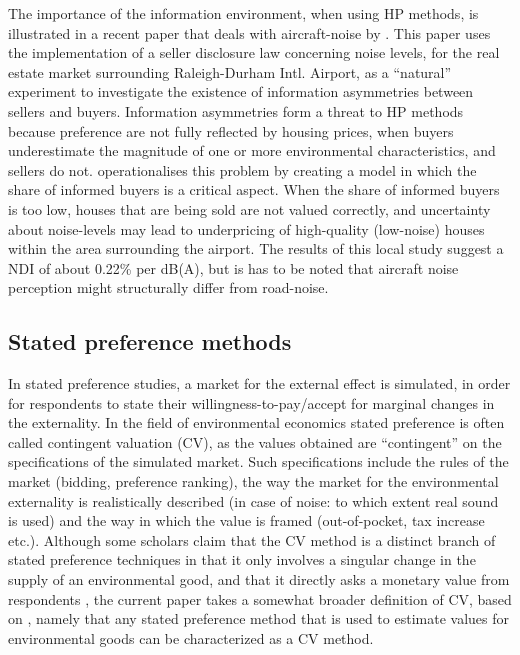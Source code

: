 \documentclass[a4paper]{scrartcl}
\begin{document}
The importance of the information environment, when using HP methods, is illustrated in a recent paper that deals with aircraft-noise by \cite{Pope2008}. This paper uses the implementation of a seller disclosure law concerning noise levels, for the real estate market surrounding Raleigh-Durham Intl. Airport, as a “natural” experiment to investigate the existence of information asymmetries between sellers and buyers.  Information asymmetries form a threat to HP methods because preference are not fully reflected by housing prices, when buyers underestimate the magnitude of one or more environmental characteristics, and sellers do not. \cite{Pope2008} operationalises this problem by creating a model in which the share of informed buyers is a critical aspect. When the share of informed buyers is too low, houses that are being sold are not valued correctly, and uncertainty about noise-levels may lead to underpricing of high-quality (low-noise) houses within the area surrounding the airport. The results of this local study suggest a NDI of about 0.22\% per dB(A), but is has to be noted that aircraft noise perception might structurally differ from road-noise.

\subsection{Stated preference methods}

In stated preference studies, a market for the external effect is simulated, in order for respondents to state their willingness-to-pay/accept for marginal changes in the externality. In the field of environmental economics stated preference is often called contingent valuation (CV), as the values obtained are “contingent” on the specifications of the simulated market. Such specifications include the rules of the market (bidding, preference ranking), the way the market for the environmental externality is realistically described (in case of noise: to which extent real sound is used) and the way in which the value is framed (out-of-pocket, tax increase etc.)\citep{Carson2005}. Although some scholars claim that the CV method is a distinct branch of stated preference techniques in that it only involves a singular change in the supply of an environmental good, and that it directly asks a monetary value from respondents \citep{Wardman2004}, the current paper takes a somewhat broader definition of CV, based on \cite{Carson2005}, namely that any stated preference method that is used to estimate values for environmental goods can be characterized as a CV method.
\end{document}
